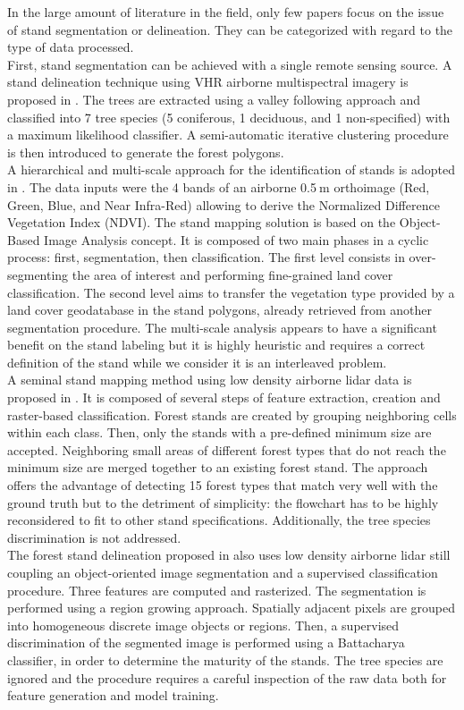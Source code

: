 In the large amount of literature in the field, only few papers focus on the issue of stand segmentation or delineation. They can be categorized with regard to the type of data processed. \\
First, stand segmentation can be achieved with a single remote sensing source. A stand delineation technique using VHR airborne multispectral imagery is proposed in \citep{leckie2003stand}. The trees are extracted using a valley following approach and classified into 7 tree species (5 coniferous, 1 deciduous, and 1 non-specified) with a maximum likelihood classifier. A semi-automatic iterative clustering procedure is then introduced to generate the forest polygons.\\
A hierarchical and multi-scale approach for the identification of stands is adopted in \citep{hernando2012spatial}. The data inputs were the 4 bands of an airborne 0.5$\:$m orthoimage (Red, Green, Blue, and Near Infra-Red) allowing to derive the Normalized Difference Vegetation Index (NDVI). The stand mapping solution is based on the Object-Based Image Analysis concept. It is composed of two main phases in a cyclic process: first, segmentation, then classification. The first level consists in over-segmenting the area of interest and performing fine-grained land cover classification. The second level aims to transfer the vegetation type provided by a land cover geodatabase in the stand polygons, already retrieved from another segmentation procedure. The multi-scale analysis appears to have a significant benefit on the stand labeling but it is highly heuristic and requires a correct definition of the stand while we consider it is an interleaved problem. \\
A seminal stand mapping method using low density airborne lidar data is proposed in \citep{koch2009airborne}. It is composed of several steps of feature extraction, creation and raster-based classification. Forest stands are created by grouping neighboring cells within each class. Then, only the stands with a pre-defined minimum size are accepted. Neighboring small areas of different forest types that do not reach the minimum size are merged together to an existing forest stand. The approach offers the advantage of detecting 15 forest types that match very well with the ground truth but to the detriment of simplicity: the flowchart has to be highly reconsidered to fit to other stand specifications. Additionally, the tree species discrimination is not addressed.\\
The forest stand delineation proposed in \citep{sullivan2009object} also uses low density airborne lidar still coupling an object-oriented image segmentation and a supervised classification procedure. Three features are computed and rasterized. The segmentation is performed using a region growing approach. Spatially adjacent pixels are grouped into homogeneous discrete image objects or regions. Then, a supervised discrimination of the segmented image is performed using a Battacharya classifier, in order to determine the maturity of the stands. The tree species are ignored and the procedure requires a careful inspection of the raw data both for feature generation and model training. \\
